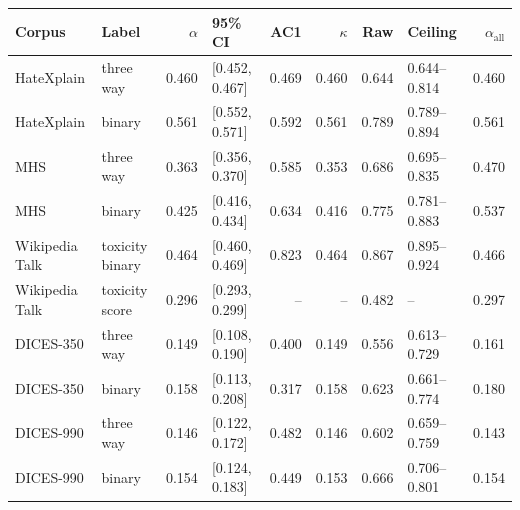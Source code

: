 \begin{tabular}{@{}llrlrrrlr@{}}
\toprule
Corpus & Label & $\alpha$ & 95\% CI & AC1 & $\kappa$ & Raw & Ceiling & $\alpha_{\text{all}}$ \\
\midrule
HateXplain & three way & 0.460 & [0.452, 0.467] & 0.469 & 0.460 & 0.644 & 0.644--0.814 & 0.460 \\
HateXplain & binary & 0.561 & [0.552, 0.571] & 0.592 & 0.561 & 0.789 & 0.789--0.894 & 0.561 \\
MHS & three way & 0.363 & [0.356, 0.370] & 0.585 & 0.353 & 0.686 & 0.695--0.835 & 0.470 \\
MHS & binary & 0.425 & [0.416, 0.434] & 0.634 & 0.416 & 0.775 & 0.781--0.883 & 0.537 \\
Wikipedia Talk & toxicity binary & 0.464 & [0.460, 0.469] & 0.823 & 0.464 & 0.867 & 0.895--0.924 & 0.466 \\
Wikipedia Talk & toxicity score & 0.296 & [0.293, 0.299] & -- & -- & 0.482 & -- & 0.297 \\
DICES-350 & three way & 0.149 & [0.108, 0.190] & 0.400 & 0.149 & 0.556 & 0.613--0.729 & 0.161 \\
DICES-350 & binary & 0.158 & [0.113, 0.208] & 0.317 & 0.158 & 0.623 & 0.661--0.774 & 0.180 \\
DICES-990 & three way & 0.146 & [0.122, 0.172] & 0.482 & 0.146 & 0.602 & 0.659--0.759 & 0.143 \\
DICES-990 & binary & 0.154 & [0.124, 0.183] & 0.449 & 0.153 & 0.666 & 0.706--0.801 & 0.154 \\
\bottomrule
\end{tabular}

